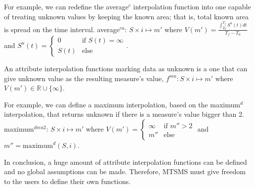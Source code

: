 For example, we can redefine the average$^{c}$ interpolation function
into one capable of treating unknown values by keeping the known area;
that is, total known area is spread on the time interval.
average$^{cu}$: $S \times i \mapsto m'$ where $V(m') =
\frac{\int_{T_0}^{T_f} S^u(t)dt}{T_f-T_0}$ and $S^u(t)=
\begin{cases}
  0 &\text{if }  S(t)=\infty\\
  S(t) & \text{else }
\end{cases}$.


An attribute interpolation functions marking data as unknown is a one
that can give unknown value as the resulting measure's value, $f^{mu}:
S \times i \mapsto m'$ where $V(m')\in \mathbb{R}\cup\{\infty\}$.

For example, we can define a maximum interpolation, based on the
maximum$^d$ interpolation, that returns unknown if there is a
measure's value bigger than 2.  maximum$^{dmu2}$: $S \times i
\mapsto m'$ where $V(m') = 
\begin{cases}
  \infty &\text{if }  m''>2\\
  m'' & \text{else }
\end{cases}$ and $m''=\text{maximum}^d(S,i)$.

    
In conclusion, a huge amount of attribute interpolation functions can
be defined and no global assumptions can be made. Therefore, MTSMS
must give freedom to the users to define their own functions.













